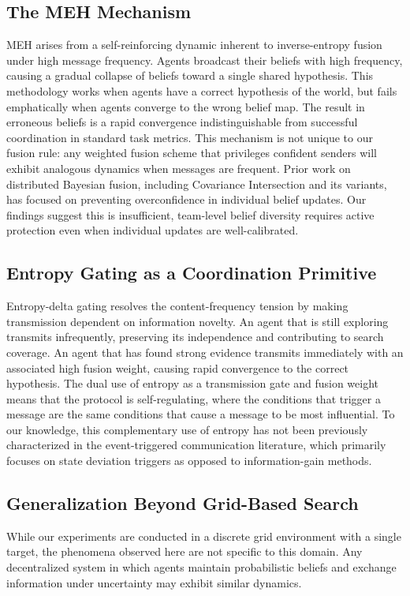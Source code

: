 \documentclass[pdflatex,sn-mathphys-num]{sn-jnl}%
\theoremstyle{thmstyleone}%
\theoremstyle{thmstyletwo}%
\theoremstyle{thmstylethree}%
\begin{document}
\subsection{The MEH Mechanism}
MEH arises from a self-reinforcing dynamic inherent to inverse-entropy fusion under high message frequency. Agents broadcast their beliefs with high frequency, causing a gradual collapse of beliefs toward a single shared hypothesis. This methodology works when agents have a correct hypothesis of the world, but fails emphatically when agents converge to the wrong belief map. The result in erroneous beliefs is a rapid convergence indistinguishable from successful coordination in standard task metrics. This mechanism is not unique to our fusion rule: any weighted fusion scheme that privileges confident senders will exhibit analogous dynamics when messages are frequent. Prior work on distributed Bayesian fusion, including Covariance 
Intersection and its variants, has focused on preventing overconfidence in individual belief updates. Our findings suggest this is insufficient, team-level belief diversity requires active protection even when individual updates are well-calibrated.

\subsection{Entropy Gating as a Coordination Primitive}
Entropy-delta gating resolves the content-frequency tension by making transmission dependent on information novelty. An agent that is still exploring transmits infrequently, preserving its independence and contributing to search coverage. An agent that has found strong evidence transmits immediately with an associated high fusion weight, causing rapid convergence to the correct hypothesis. The dual use of entropy as a transmission gate and fusion weight means that the protocol is self-regulating, where the conditions that trigger a message are the same conditions that cause a message to be most influential. To our knowledge, this complementary use of entropy has not been previously characterized in the event-triggered communication literature, which primarily focuses on state deviation triggers as opposed to information-gain methods.

\subsection{Generalization Beyond Grid-Based Search}

While our experiments are conducted in a discrete grid environment with a single target, the phenomena observed here are not specific to this domain. Any decentralized system in which agents maintain probabilistic beliefs and exchange information under uncertainty may exhibit similar dynamics.
\end{document}
